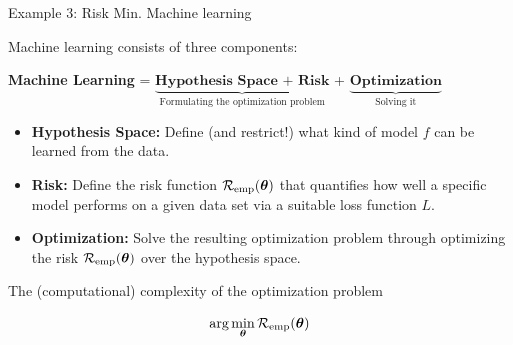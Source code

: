 \begin{vbframe}{Example 3: Risk Min. Machine learning}
		
Machine learning consists of three components: 

\begin{center}

  \textbf{Machine Learning} = $\underbrace{\textbf{Hypothesis Space + Risk}}_{\text{Formulating the optimization problem}}$ + $\underbrace{\textbf{Optimization}}_{\text{Solving it}}$
  
\end{center}

\lz

\begin{itemize}

  \item \textbf{Hypothesis Space:} Define (and restrict!) what kind of model 
  $f$ can be learned from the data.
  
  \item \textbf{Risk:} Define the risk function $\mathcal{R}_{\text{emp}}(\bm{\theta})$ that quantifies how well a specific model performs on a given 
  data set via a suitable loss function $L$.
  
  \item \textbf{Optimization:} Solve the resulting optimization problem through optimizing the risk $\mathcal{R}_{\text{emp}}(\bm{\theta})$ over the hypothesis space.
  
\end{itemize}

\framebreak 

The (computational) complexity of the optimization problem 

$$
\text{arg} \min_{\bm{\theta}} \mathcal{R}_{\text{emp}}(\bm{\theta})
$$


\end{vbframe}
